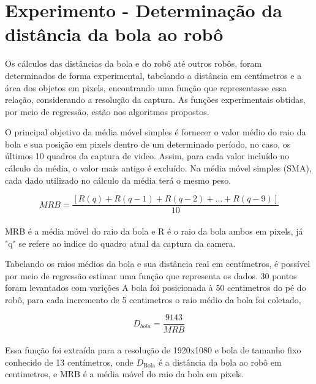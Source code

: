 
\section{Experimento - Determinação da distância da bola ao robô}

Os cálculos das distâncias da bola e do robô até outros robôs, foram determinados de forma experimental, tabelando a distância em centímetros e a área dos objetos em pixels, encontrando uma função que representasse essa relação, considerando a resolução da captura. As funções experimentais obtidas, por meio de regressão, estão nos algoritmos propostos.


O principal objetivo da média móvel simples é fornecer o valor médio do raio da bola e sua posição em pixels dentro de um determinado período, no caso, os últimos 10 quadros da captura de video. Assim, para cada valor incluído no cálculo da média, o valor mais antigo é excluído. Na média móvel simples (SMA), cada dado utilizado no cálculo da média terá o mesmo peso. 

\begin{equation} 
	MRB = \frac {[R(q) + R(q-1) + R(q-2) + … + R(q-9)]}  {10}
\end{equation}\\

MRB é a média móvel do raio da bola e R é o raio da bola ambos em pixels, já "q" se refere ao indice do quadro atual da captura da camera. 

Tabelando os raios médios da bola e sua distância real em centímetros, é possível por meio de regressão estimar uma função que representa os dados. 30 pontos foram levantados com varições A bola foi posicionada à 50 centimetros do pé do robô, para cada incremento de 5 centimetros o raio médio da bola foi coletado, 

\begin{equation} 
	D_{bola} = \frac {9143} {MRB}
\end{equation}\\

Essa função foi extraída para a resolução de 1920x1080 e bola de tamanho fixo conhecido de 13 centímetros, onde \(D_{\text{Bola}}\) é a distância da bola ao robô em centimetros, e MRB é a média móvel do raio da bola em pixels.

